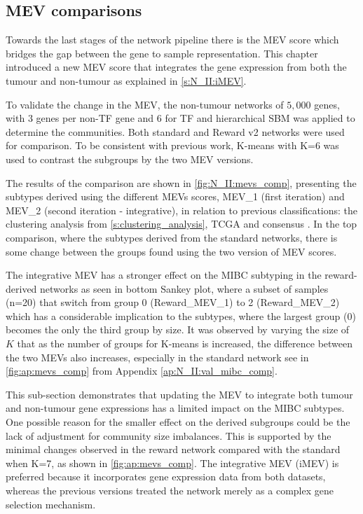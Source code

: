 \subsection{MEV comparisons} \label{s:N_II:mev_comp}

Towards the last stages of the network pipeline there is the MEV score which bridges the gap between the gene to sample representation. This chapter introduced a new MEV score that integrates the gene expression from both the tumour and non-tumour as explained in \cref{s:N_II:iMEV}.

To validate the change in the MEV, the non-tumour networks of $5,000$ genes, with $3$ genes per non-TF gene and $6$ for TF and hierarchical SBM was applied to determine the communities. Both standard and Reward v2 networks were used for comparison. To be consistent with previous work, K-means with K=6 was used to contrast the subgroups by the two MEV versions. 

The results of the comparison are shown in \cref{fig:N_II:mevs_comp}, presenting the subtypes derived using the different MEVs scores, MEV\_1 (first iteration) and MEV\_2 (second iteration - integrative), in relation to previous classifications: the clustering analysis from \cref{s:clustering_analysis}, TCGA and consensus \citep{Robertson2017-mg,Kamoun2020-tj}. In the top comparison, where the subtypes derived from the standard networks, there is some change between the groups found using the two version of MEV scores.

The integrative MEV has a stronger effect on the MIBC subtyping in the reward-derived networks as seen in bottom Sankey plot, where a subset of samples (n=20) that switch from group 0 (Reward\_MEV\_1) to 2 (Reward\_MEV\_2) which has a considerable implication to the subtypes, where the largest group (0) becomes the only the third group by size. It was observed by varying the size of $K$ that as the number of groups for K-means is increased, the difference between the two MEVs also increases, especially in the standard network see in \cref{fig:ap:mevs_comp} from Appendix \cref{ap:N_II:val_mibc_comp}.  

This sub-section demonstrates that updating the MEV to integrate both tumour and non-tumour gene expressions has a limited impact on the MIBC subtypes. One possible reason for the smaller effect on the derived subgroups could be the lack of adjustment for community size imbalances. This is supported by the minimal changes observed in the reward network compared with the standard when K=7, as shown in \cref{fig:ap:mevs_comp}. The integrative MEV (iMEV) is preferred because it incorporates gene expression data from both datasets, whereas the previous versions treated the network merely as a complex gene selection mechanism.


